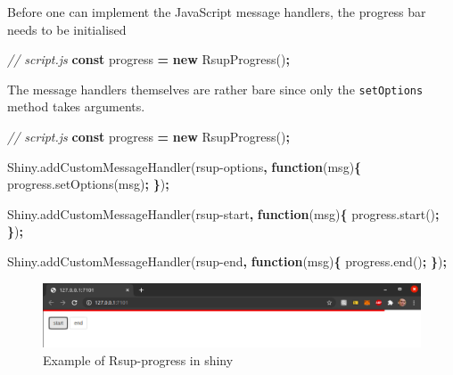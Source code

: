 \documentclass[
]{krantz}
\makeatletter
\newenvironment{Shaded}{\begin{snugshade}}{\end{snugshade}}
\newcommand{\AttributeTok}[1]{\textcolor[rgb]{0.61,0.61,0.61}{#1}}
\newcommand{\CommentTok}[1]{\textcolor[rgb]{0.37,0.37,0.37}{\textit{#1}}}
\newcommand{\KeywordTok}[1]{\textcolor[rgb]{0.27,0.27,0.27}{\textbf{#1}}}
\newcommand{\NormalTok}[1]{#1}
\newcommand{\OperatorTok}[1]{\textcolor[rgb]{0.43,0.43,0.43}{\textbf{#1}}}
\newcommand{\StringTok}[1]{\textcolor[rgb]{0.5,0.5,0.5}{#1}}
\newcommand{\VariableTok}[1]{\textcolor[rgb]{0,0,0}{#1}}
\newenvironment{kframe}{%
\medskip{}
\setlength{\fboxsep}{.8em}
 \def\at@end@of@kframe{}%
 \ifinner\ifhmode%
  \def\at@end@of@kframe{\end{minipage}}%
  \begin{minipage}{\columnwidth}%
 \fi\fi%
 \def\FrameCommand##1{\hskip\@totalleftmargin \hskip-\fboxsep
 \colorbox{shadecolor}{##1}\hskip-\fboxsep
     \hskip-\linewidth \hskip-\@totalleftmargin \hskip\columnwidth}%
 \MakeFramed {\advance\hsize-\width
   \@totalleftmargin\z@ \linewidth\hsize
   \@setminipage}}%
 {\par\unskip\endMakeFramed%
 \at@end@of@kframe}
\renewenvironment{Shaded}{\begin{kframe}}{\end{kframe}}
\makeatother
\begin{document}
Before one can implement the JavaScript message handlers, the progress bar needs to be initialised

\begin{Shaded}
\begin{Highlighting}[]
\CommentTok{// script.js}
\KeywordTok{const}\NormalTok{ progress }\OperatorTok{=} \KeywordTok{new} \AttributeTok{RsupProgress}\NormalTok{()}\OperatorTok{;}
\end{Highlighting}
\end{Shaded}

The message handlers themselves are rather bare since only the \texttt{setOptions} method takes arguments.

\begin{Shaded}
\begin{Highlighting}[]
\CommentTok{// script.js}
\KeywordTok{const}\NormalTok{ progress }\OperatorTok{=} \KeywordTok{new} \AttributeTok{RsupProgress}\NormalTok{()}\OperatorTok{;}

\VariableTok{Shiny}\NormalTok{.}\AttributeTok{addCustomMessageHandler}\NormalTok{(}\StringTok{\textquotesingle{}rsup{-}options\textquotesingle{}}\OperatorTok{,} \KeywordTok{function}\NormalTok{(msg)}\OperatorTok{\{}
  \VariableTok{progress}\NormalTok{.}\AttributeTok{setOptions}\NormalTok{(msg)}\OperatorTok{;}
\OperatorTok{\}}\NormalTok{)}\OperatorTok{;}

\VariableTok{Shiny}\NormalTok{.}\AttributeTok{addCustomMessageHandler}\NormalTok{(}\StringTok{\textquotesingle{}rsup{-}start\textquotesingle{}}\OperatorTok{,} \KeywordTok{function}\NormalTok{(msg)}\OperatorTok{\{}
  \VariableTok{progress}\NormalTok{.}\AttributeTok{start}\NormalTok{()}\OperatorTok{;}
\OperatorTok{\}}\NormalTok{)}\OperatorTok{;}

\VariableTok{Shiny}\NormalTok{.}\AttributeTok{addCustomMessageHandler}\NormalTok{(}\StringTok{\textquotesingle{}rsup{-}end\textquotesingle{}}\OperatorTok{,} \KeywordTok{function}\NormalTok{(msg)}\OperatorTok{\{}
  \VariableTok{progress}\NormalTok{.}\AttributeTok{end}\NormalTok{()}\OperatorTok{;}
\OperatorTok{\}}\NormalTok{)}\OperatorTok{;}
\end{Highlighting}
\end{Shaded}

\begin{figure}
\centering
\includegraphics{images/rsup.png}
\caption{Example of Rsup-progress in shiny}
\end{figure}
\end{document}

